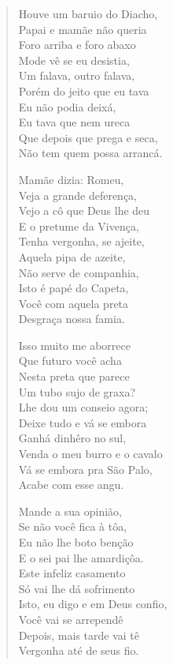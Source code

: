 \begin{verse}
Houve um baruio do Diacho,\\
Papai e mamãe não queria\\
Foro arriba e foro abaxo\\
Mode vê se eu desistia,\\
Um falava, outro falava,\\
Porém do jeito que eu tava\\
Eu não podia deixá,\\
Eu tava que nem ureca\\
Que depois que prega e seca,\\
Não tem quem possa arrancá.

Mamãe dizia: Romeu,\\
Veja a grande deferença,\\
Vejo a cô que Deus lhe deu\\
E o pretume da Vivença,\\
Tenha vergonha, se ajeite,\\
Aquela pipa de azeite,\\
Não serve de companhia,\\
Isto é papé do Capeta,\\
Você com aquela preta\\
Desgraça nossa famia.

Isso muito me aborrece\\
Que futuro você acha\\
Nesta preta que parece\\
Um tubo sujo de graxa?\\
Lhe dou um conseio agora;\\
Deixe tudo e vá se embora\\
Ganhá dinhêro no sul,\\
Venda o meu burro e o cavalo\\
Vá se embora pra São Palo,\\
Acabe com esse angu.

Mande a sua opinião,\\
Se não você fica à tôa,\\
Eu não lhe boto benção\\
E o sei pai lhe amardiçôa.\\
Este infeliz casamento\\
Só vai lhe dá sofrimento\\
Isto, eu digo e em Deus confio,\\
Você vai se arrependê\\
Depois, mais tarde vai tê\\
Vergonha até de seus fio.


\end{verse}

